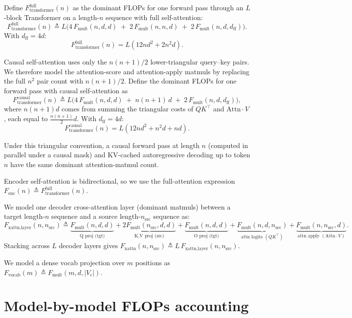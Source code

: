 \documentclass[11pt]{article}
\begin{document}
Define $F_{\text{transformer}}^{\text{full}}(n)$ as the dominant FLOPs for one forward pass through an $L$-block Transformer
on a length-$n$ sequence with full self-attention:
\[
F_{\text{transformer}}^{\text{full}}(n)
\triangleq
L\Big(
4\,F_{\text{mult}}(n,d,d)
\;+\;
2\,F_{\text{mult}}(n,n,d)
\;+\;
2\,F_{\text{mult}}(n,d,d_{\text{ff}})
\Big).
\]
With $d_{\text{ff}}=4d:$
\[
F_{\text{transformer}}^{\text{full}}(n)=L\left(12nd^2 + 2n^2d\right).
\]

Causal self-attention uses only the $n(n+1)/2$ lower-triangular query--key pairs.
We therefore model the attention-score and attention-apply matmuls by replacing the full $n^2$ pair count with $n(n+1)/2$. Define the dominant FLOPs for one forward pass with causal self-attention as
\[
F_{\text{transformer}}^{\text{causal}}(n)
\triangleq
L\Big(
4\,F_{\text{mult}}(n,d,d)
\;+\;
n(n+1)\,d
\;+\;
2\,F_{\text{mult}}(n,d,d_{\text{ff}})
\Big),
\]
where $n(n+1)d$ comes from summing the triangular costs of $QK^\top$ and $\mathrm{Attn}\cdot V$, each equal to $\frac{n(n+1)}{2}d$. With $d_{\text{ff}}=4d:$
\[
F_{\text{transformer}}^{\text{causal}}(n)
=
L\left(12nd^2 + n^2d + nd\right).
\]

Under this triangular convention, a causal forward pass at length $n$ (computed in parallel under a causal mask) and KV-cached
autoregressive decoding up to token $n$ have the same dominant attention-matmul count.

Encoder self-attention is bidirectional, so we use the full-attention expression
$F_{\text{enc}}(n)\triangleq F_{\text{transformer}}^{\text{full}}(n)$.

We model one decoder cross-attention layer (dominant matmuls) between a target length-$n$ sequence and a source length-$n_{\text{src}}$
sequence as:
\[
F_{\text{xattn,layer}}(n,n_{\text{src}})
\triangleq
\underbrace{F_{\text{mult}}(n, d, d)}_{\text{Q proj (tgt)}}
+\underbrace{2F_{\text{mult}}(n_{\text{src}}, d, d)}_{\text{K,V proj (src)}}
+\underbrace{F_{\text{mult}}(n, d, d)}_{\text{O proj (tgt)}}
+\underbrace{F_{\text{mult}}(n, d, n_{\text{src}})}_{\text{attn logits }(QK^\top)}
+\underbrace{F_{\text{mult}}(n, n_{\text{src}}, d)}_{\text{attn apply }(\mathrm{Attn}\cdot V)}.
\]
Stacking across $L$ decoder layers gives
$F_{\text{xattn}}(n,n_{\text{src}})\triangleq L\,F_{\text{xattn,layer}}(n,n_{\text{src}})$.

We model a dense vocab projection over $m$ positions as
$F_{\text{vocab}}(m)\triangleq F_{\text{mult}}(m,d,|V_c|)$.

\section{Model-by-model FLOPs accounting}
\end{document}
